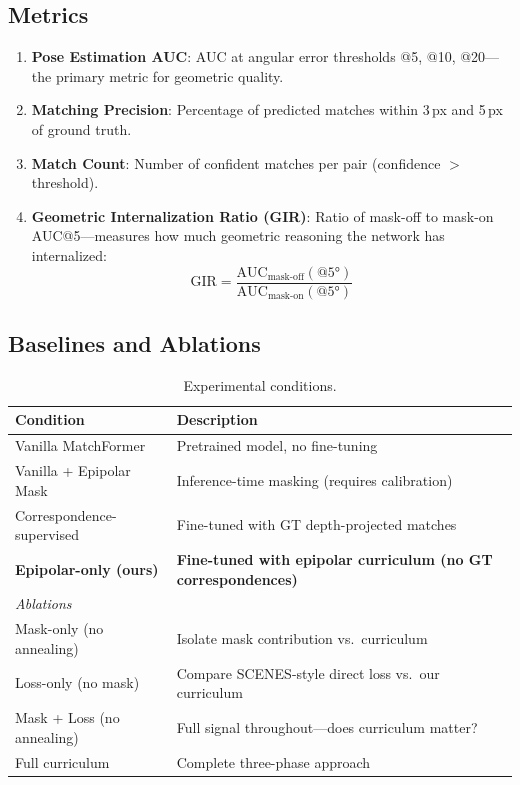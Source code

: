 \documentclass[11pt,a4paper]{article}
\begin{document}
\subsection{Metrics}

\begin{enumerate}[leftmargin=*]
    \item \textbf{Pose Estimation AUC}: AUC at angular error thresholds @5\textdegree, @10\textdegree, @20\textdegree---the primary metric for geometric quality.
    \item \textbf{Matching Precision}: Percentage of predicted matches within 3\,px and 5\,px of ground truth.
    \item \textbf{Match Count}: Number of confident matches per pair (confidence $>$ threshold).
    \item \textbf{Geometric Internalization Ratio (GIR)}: Ratio of mask-off to mask-on AUC@5\textdegree---measures how much geometric reasoning the network has internalized:
    \begin{equation}
        \text{GIR} = \frac{\text{AUC}_{\text{mask-off}}(@5°)}{\text{AUC}_{\text{mask-on}}(@5°)}
    \end{equation}
\end{enumerate}

\subsection{Baselines and Ablations}

\begin{table}[h]
\centering
\caption{Experimental conditions.}
\begin{tabular}{ll}
\toprule
\textbf{Condition} & \textbf{Description} \\
\midrule
Vanilla MatchFormer & Pretrained model, no fine-tuning \\
Vanilla + Epipolar Mask & Inference-time masking (requires calibration) \\
Correspondence-supervised & Fine-tuned with GT depth-projected matches \\
\textbf{Epipolar-only (ours)} & \textbf{Fine-tuned with epipolar curriculum (no GT correspondences)} \\
\midrule
\multicolumn{2}{l}{\textit{Ablations}} \\
\midrule
Mask-only (no annealing) & Isolate mask contribution vs.\ curriculum \\
Loss-only (no mask) & Compare SCENES-style direct loss vs.\ our curriculum \\
Mask + Loss (no annealing) & Full signal throughout---does curriculum matter? \\
Full curriculum & Complete three-phase approach \\
\bottomrule
\end{tabular}
\end{table}
\end{document}
